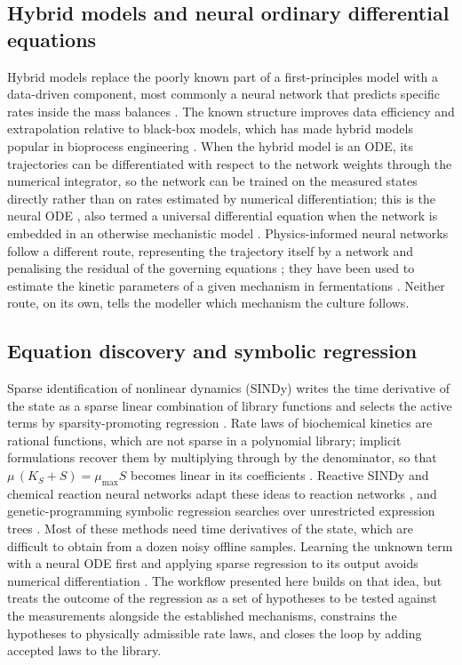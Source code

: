 \subsection{Hybrid models and neural ordinary differential equations}
Hybrid models replace the poorly known part of a first-principles model with a data-driven component, most commonly a neural network that predicts specific rates inside the mass balances \citep{Psichogios1992,Thompson1994,Oliveira2004}. The known structure improves data efficiency and extrapolation relative to black-box models, which has made hybrid models popular in bioprocess engineering \citep{vonStosch2014,Narayanan2020,Sansana2021,Bradley2022}. When the hybrid model is an ODE, its trajectories can be differentiated with respect to the network weights through the numerical integrator, so the network can be trained on the measured states directly rather than on rates estimated by numerical differentiation; this is the neural ODE \citep{Chen2018,Kidger2021}, also termed a universal differential equation when the network is embedded in an otherwise mechanistic model \citep{Rackauckas2020}. Physics-informed neural networks follow a different route, representing the trajectory itself by a network and penalising the residual of the governing equations \citep{Raissi2019}; they have been used to estimate the kinetic parameters of a given mechanism in fermentations \citep{Bangi2022}. Neither route, on its own, tells the modeller which mechanism the culture follows.

\subsection{Equation discovery and symbolic regression}
Sparse identification of nonlinear dynamics (SINDy) writes the time derivative of the state as a sparse linear combination of library functions and selects the active terms by sparsity-promoting regression \citep{Brunton2016}. Rate laws of biochemical kinetics are rational functions, which are not sparse in a polynomial library; implicit formulations recover them by multiplying through by the denominator, so that $\mu\,(K_S + S) = \mu_{\max} S$ becomes linear in its coefficients \citep{Mangan2016,Kaheman2020}. Reactive SINDy and chemical reaction neural networks adapt these ideas to reaction networks \citep{Hoffmann2019,JiDeng2021}, and genetic-programming symbolic regression searches over unrestricted expression trees \citep{Schmidt2009,Cranmer2023}. Most of these methods need time derivatives of the state, which are difficult to obtain from a dozen noisy offline samples. Learning the unknown term with a neural ODE first and applying sparse regression to its output avoids numerical differentiation \citep{Rackauckas2020}. The workflow presented here builds on that idea, but treats the outcome of the regression as a set of hypotheses to be tested against the measurements alongside the established mechanisms, constrains the hypotheses to physically admissible rate laws, and closes the loop by adding accepted laws to the library.

